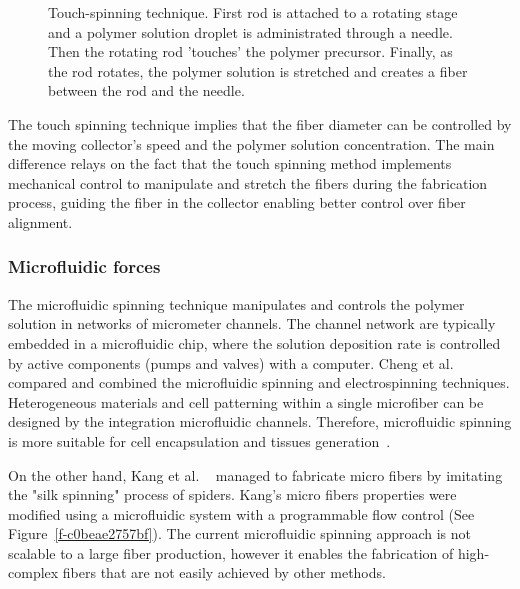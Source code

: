 \bgroup
\begin{figure}[!htbp]
\centering \makeatletter{}
\makeatother 
\caption{{Touch-spinning technique. First rod is attached to a rotating stage and a polymer solution droplet is administrated through a needle. Then the rotating rod 'touches' the polymer precursor. Finally, as the rod rotates, the polymer solution is stretched and creates a fiber between the rod and the needle.}}
\label{f-f17259e76303}
\end{figure}
\egroup
The touch spinning technique implies that the fiber diameter can be controlled by the moving collector's speed and the polymer solution concentration. The main difference relays on the fact that the touch spinning method implements mechanical control to manipulate and stretch the fibers during the fabrication process, guiding the fiber in the collector enabling better control over fiber alignment.\unskip~\cite{527120:14091959}



\subsubsection{Microfluidic forces}The microfluidic spinning technique manipulates and controls the polymer solution in networks of micrometer channels. The channel network are typically embedded in a microfluidic chip, where the solution deposition rate is controlled by active components (pumps and valves) with a computer. Cheng et al. \unskip~\cite{527120:13656236} compared and combined the microfluidic spinning and electrospinning techniques. Heterogeneous materials and cell patterning within a single microfiber can be designed by the integration microfluidic channels. Therefore, microfluidic spinning is more suitable for cell encapsulation and tissues generation\unskip~\cite{527120:13656236}.

On the other hand, Kang et al. \unskip~\cite{527120:13656548} managed to fabricate micro fibers by imitating the "silk spinning" process of spiders. Kang's micro fibers properties were modified using a microfluidic system with a programmable flow control (See Figure~\ref{f-c0beae2757bf}). The current microfluidic spinning approach is not scalable to a large fiber production, however it enables the fabrication of high-complex fibers that are not easily achieved by other methods.


